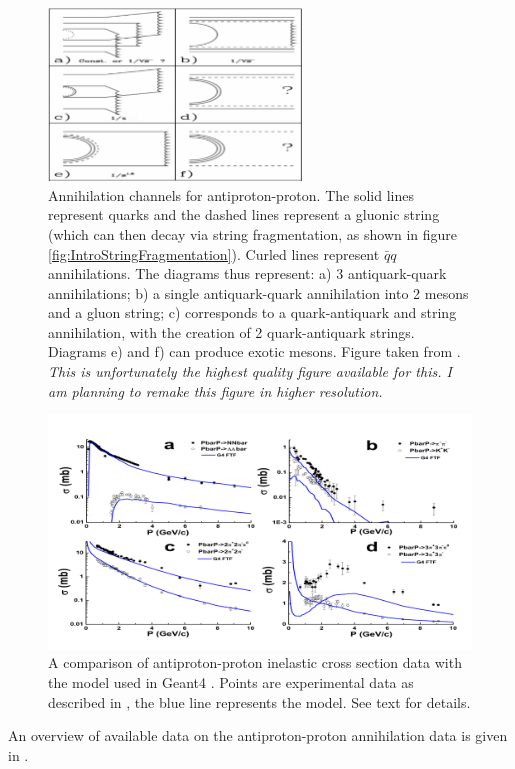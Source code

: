 \begin{figure}
    \centering
    \includegraphics[width=0.6\textwidth]{figures/pbar_p_annihilation_channels.png}
    \caption{Annihilation channels for antiproton-proton. The solid lines represent quarks and the dashed lines represent a gluonic string (which can then decay via string fragmentation, as shown in figure \ref{fig:IntroStringFragmentation}). Curled lines represent $\bar{q}q$ annihilations. The diagrams thus represent: a) 3 antiquark-quark annihilations; b) a single antiquark-quark annihilation into 2 mesons and a gluon string; c) corresponds to a quark-antiquark and string annihilation, with the creation of 2 quark-antiquark strings. Diagrams e) and f) can produce exotic mesons. Figure taken from \cite{antiproton_dynamics_2}. \textit{This is unfortunately the highest quality figure available for this. I am planning to remake this figure in higher resolution.}}
    \label{fig:antiproton_annihilation_channels}
\end{figure}
\begin{figure}[h!]
    \centering
    \includegraphics[width=\textwidth]{figures/Geant4_pbar_inel.png}
    \caption{A comparison of antiproton-proton inelastic cross section data with the model used in Geant4 \cite{antiproton_dynamics_CERN}. Points are experimental data as described in \cite{pbar_data}, the blue line represents the model. See text for details.}
    \label{fig:pbar_p_xs_data_comp}
\end{figure}
An overview of available data on the antiproton-proton annihilation data is given in \cite{hidden_Strangeness, antiproton_physics_data, pbar_data}.



